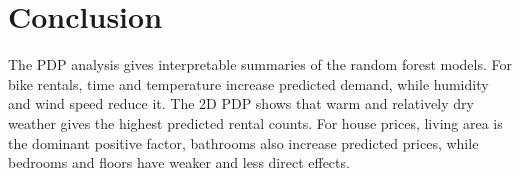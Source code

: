 \documentclass[11pt,a4paper]{article}
\begin{document}
\section{Conclusion}

The PDP analysis gives interpretable summaries of the random forest models. For
bike rentals, time and temperature increase predicted demand, while humidity and
wind speed reduce it. The 2D PDP shows that warm and relatively dry weather gives
the highest predicted rental counts. For house prices, living area is the dominant
positive factor, bathrooms also increase predicted prices, while bedrooms and
floors have weaker and less direct effects.
\end{document}
